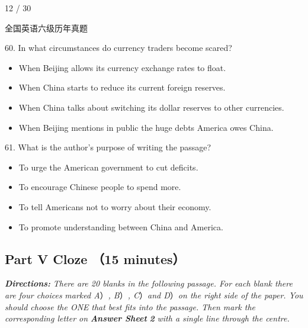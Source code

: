 \documentclass[UTF8,11pt]{ctexart}
\begin{document}
12 / 30


全国英语六级历年真题


60. In what circumstances do currency traders become scared?


\begin{itemize}[leftmargin=2em,itemsep=.2em,topsep=.4em]\item[A.] When Beijing allows its currency exchange rates to float.
\item[B.] When China starts to reduce its current foreign reserves.
\item[C.] When China talks about switching its dollar reserves to other currencies.
\item[D.] When Beijing mentions in public the huge debts America owes China.
\end{itemize}

61. What is the author’s purpose of writing the passage?


\begin{itemize}[leftmargin=2em,itemsep=.2em,topsep=.4em]\item[A.] To urge the American government to cut deficits.
\item[B.] To encourage Chinese people to spend more.
\item[C.] To tell Americans not to worry about their economy.
\item[D.] To promote understanding between China and America.
\end{itemize}

\subsection*{\textbf{Part V} \textbf{Cloze} （\textbf{15 minutes}）}


\textbf{\textit{Directions:}}\textit{ There are 20 blanks in the following passage. For each blank there are four choices} \textit{marked A}）\textit{, B}）\textit{, C}）\textit{and D}）\textit{on the right side of the paper. You should choose the ONE} \textit{that best fits into the passage. Then mark the corresponding letter on}\textbf{\textit{ Answer Sheet}} \textbf{\textit{2}}\textit{ with a single line through the centre.}
\end{document}
